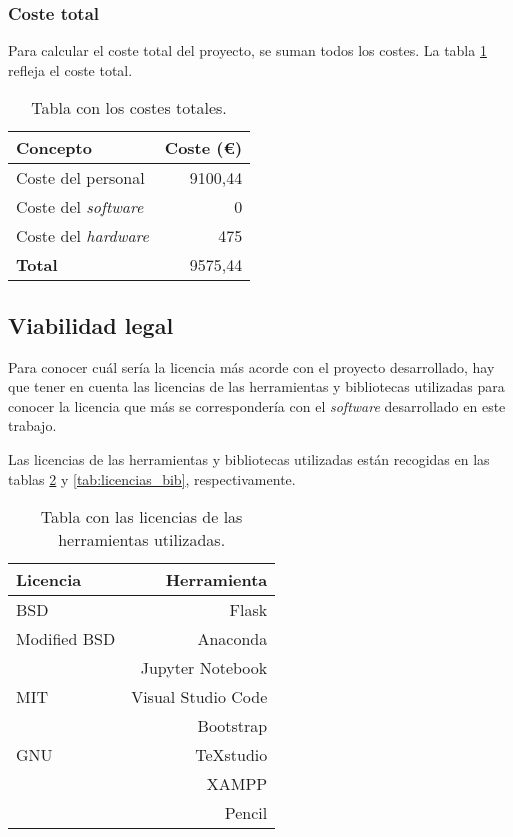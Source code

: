 \subsubsection{Coste total}
Para calcular el coste total del proyecto, se suman todos los costes. La tabla \ref{tab:coste_total} refleja el coste total.

\begin{table}[h]
	\begin{center}
		\begin{tabular}{ l r }
			\toprule
			\textbf{Concepto} & \textbf{Coste (€)} \\ \midrule
			Coste del personal & 9100,44 \\
			Coste del \textit{software} & 0 \\
			Coste del \textit{hardware} & 475 \\\midrule
			\textbf{Total} & 9575,44 \\ \bottomrule
		\end{tabular}
		\caption{Tabla con los costes totales.}
		\label{tab:coste_total}
	\end{center}
\end{table}

\subsection{Viabilidad legal}
Para conocer cuál sería la licencia más acorde con el proyecto desarrollado, hay que tener en cuenta las licencias de las herramientas y bibliotecas utilizadas para conocer la licencia que más se correspondería con el \textit{software} desarrollado en este trabajo. 

Las licencias de las herramientas y bibliotecas utilizadas están recogidas en las tablas \ref{tab:licencias_herr} y \ref{tab:licencias_bib}, respectivamente.

\begin{table}[h]
	\begin{center}
		\begin{tabular}{ l r }
			\toprule
			\textbf{Licencia} & \textbf{Herramienta} \\ \midrule
			BSD & Flask \\ \midrule
			Modified BSD & Anaconda \\ 
			& Jupyter Notebook \\ \midrule
			MIT & Visual Studio Code \\
			& Bootstrap \\ \midrule
			GNU & TeXstudio \\
			& XAMPP \\ 
			& Pencil \\ \bottomrule
		\end{tabular}
		\caption{Tabla con las licencias de las herramientas utilizadas.}
		\label{tab:licencias_herr}
	\end{center}
\end{table}

